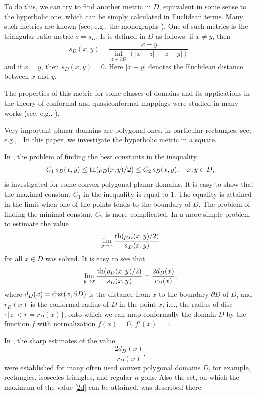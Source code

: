 \documentclass[12pt,a4paper]{amsart}
\def\th{\mathop{\rm th}\nolimits}
\begin{document}
To do this, we can try to find another metric in  $D$,  equivalent
in some sense to the hyperbolic one, which can be simply calculated
in Euclidean terms. Many such metrics are known (see, e.g., the
monographs \cite{HKV,papa}). One of such metrics is the triangular
ratio
 metric $s=s_D$. Is is defined in $D$ as follows: if
$x\neq y$, then
$$
s_D(x,y)=\frac{|x-y|}{\inf_{z\in \partial D}(|x-z|+|z-y|)},
$$
and if $x=y$, then $s_D(x,y)=0$. Here $|x-y|$ denotes the Euclidean distance between $x$ and $y$.

The properties of this metric for some classes of domains and its
applications in the theory of conformal and quasiconformal mappings
were studied in many works (see, e.g.,
\cite{dknv,ranio,ranio2,ranio_vuor2,ranio_vuor}).

Very important planar domains are polygonal ones, in particular rectangles, see, e.g., \cite{b1,b2,dknv}. In this paper, we investigate the hyperbolic metric in a square.

In \cite{dknv}, the problem of finding the best constants in the
inequality
\begin{equation}\label{1d}
C_1\,s_D(x,y)\le\th (\rho_D(x,y)/2)\le C_2\,s_D(x,y), \quad x,y \in
D,
\end{equation}
 is investigated for some convex polygonal planar domains. It is easy to show that
  the maximal constant $C_1$ in the inequality is equal to $1$. The equality is attained in the
  limit when one of the points tends to the boundary of $D$. The problem of finding the
  minimal constant $C_2$ is more complicated. In \cite{dknv} a more simple problem to estimate the value
\begin{equation*}
\lim_{y\to x}\frac{\th (\rho_D(x,y)/2)}{s_D(x,y)}
\end{equation*}
for all $x\in D$ was solved. It is easy to see that
$$
\lim_{y\to x}\frac{\th (\rho_D(x,y)/2)}{s_D(x,y)}= \frac{2d_D(x)}{r_D(x)},
$$
where $d_D(x)=\mbox{\rm dist}(x,\partial D)$ is the distance from
$x$ to the boundary $\partial D$ of $D$, and $r_D(x)$ is the
conformal radius of $D$ in the point $x$, i.e., the radius of disc
$\{|z|<r=r_D(x)\}$, onto which we can map conformally the domain $D$
by the function $f$ with normalization $f(x)=0$, $f'(x)=1$.

In \cite{dknv}, the sharp estimates of the value
\begin{equation}\label{2d}
\frac{2d_D(x)}{r_D(x)},
\end{equation}
were established for many often used convex polygonal domains $D$,
for example, rectangles, isosceles triangles, and regular $n$-gons.
Also the set, on which the maximum of the value \eqref{2d} can be
attained, was described there.
\end{document}
